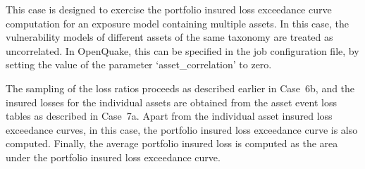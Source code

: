 This case is designed to exercise the portfolio insured loss exceedance curve computation for an exposure model containing multiple assets. In this case, the vulnerability models of different assets of the same taxonomy are treated as uncorrelated. In OpenQuake, this can be specified in the job configuration file, by setting the value of the parameter `asset\_correlation' to zero.

The sampling of the loss ratios proceeds as described earlier in Case~6b, and the insured losses for the individual assets are obtained from the asset event loss tables as described in Case~7a. Apart from the individual asset insured loss exceedance curves, in this case, the portfolio insured loss exceedance curve is also computed. Finally, the average portfolio insured loss is computed as the area under the portfolio insured loss exceedance curve.